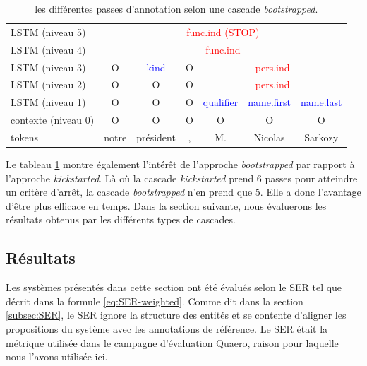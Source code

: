 \documentclass[12pt,a4paper,times,twoside,openright]{report}
\begin{document}
\begin{table}[ht!]
    \centering
    \begin{tabular}{|l|cccccc|}
    \hline
    LSTM (niveau 5)     & \multicolumn{6}{c|}{\textcolor{red}{func.ind (STOP)}} \\
    \cline{2-7}
    LSTM (niveau 4)     & \multicolumn{6}{c|}{\textcolor{red}{func.ind}} \\
    \cline{2-7}
    LSTM (niveau 3)     & O & \multicolumn{1}{|c|}{\textcolor{blue}{kind}} & O & \multicolumn{3}{|c|}{\textcolor{red}{pers.ind}} \\
    \cline{3-3}\cline{5-7}
    LSTM (niveau 2)     & O & O & O & \multicolumn{3}{|c|}{\textcolor{red}{pers.ind}} \\
    \cline{5-7}
    LSTM (niveau 1)     & O & O & O & \multicolumn{1}{|c|}{\textcolor{blue}{qualifier}} & \multicolumn{1}{c|}{\textcolor{blue}{name.first}} & \multicolumn{1}{c|}{\textcolor{blue}{name.last}} \\
    \cline{5-7}
    contexte (niveau 0) & O & O & O & O & O & O \\
    \hline
    tokens                & notre & président & , & M. & Nicolas & Sarkozy \\
    \hline
    \end{tabular}
    \caption{les différentes passes d'annotation selon une cascade \textit{bootstrapped}.}
    \label{tab:bootstrap-annotations}
\end{table}

Le tableau \ref{tab:bootstrap-annotations} montre également l'intérêt de l'approche \textit{bootstrapped} par rapport à l'approche \textit{kickstarted}. Là où la cascade \textit{kickstarted} prend 6 passes pour atteindre un critère d'arrêt, la cascade \textit{bootstrapped} n'en prend que 5. Elle a donc l'avantage d'être plus efficace en temps. Dans la section suivante, nous évaluerons les résultats obtenus par les différents types de cascades.


    
        \subsection{Résultats}
        \label{subsec:cascades-results}
Les systèmes présentés dans cette section ont été évalués selon le SER tel que décrit dans la formule \ref{eq:SER-weighted}. Comme dit dans la section \ref{subsec:SER}, le SER ignore la structure des entités et se contente d'aligner les propositions du système avec les annotations de référence. Le SER était la métrique utilisée dans le campagne d'évaluation Quaero, raison pour laquelle nous l'avons utilisée ici.
\end{document}
